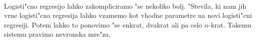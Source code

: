 \paragraph{}
Logisti"cno regresijo lahko zakompliciramo "se nekoliko bolj. "Stevila, ki nam jih vrne logisti"cna regresija lahko vzamemo kot vhodne parametre na novi logisti"cni regresiji. Potem lahko to ponovimo "se enkrat, dvakrat ali pa celo $n$-krat. Takemu sistemu pravimo nevronska mre"za. 
